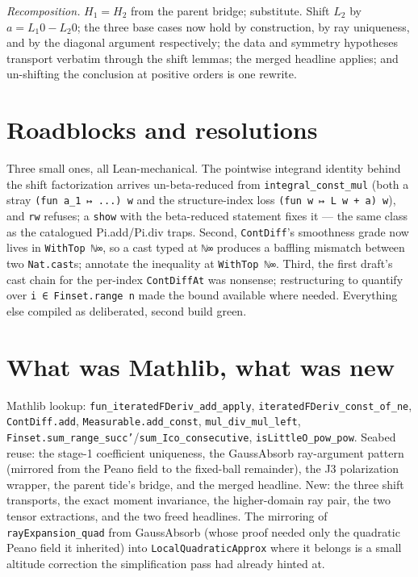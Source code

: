 \documentclass[11pt]{article}
\begin{document}
\emph{Recomposition.} $H_1 = H_2$ from the parent bridge; substitute.
Shift $L_2$ by $a = L_1 0 - L_2 0$; the three base cases now hold by
construction, by ray uniqueness, and by the diagonal argument
respectively; the data and symmetry hypotheses transport verbatim through
the shift lemmas; the merged headline applies; and un-shifting the
conclusion at positive orders is one rewrite.

\section{Roadblocks and resolutions}

Three small ones, all Lean-mechanical. The pointwise integrand identity
behind the shift factorization arrives un-beta-reduced from
\texttt{integral\_const\_mul} (both a stray \texttt{(fun a\_1 ↦ ...) w}
and the structure-index loss \texttt{(fun w ↦ L w + a) w}), and
\texttt{rw} refuses; a \texttt{show} with the beta-reduced statement
fixes it --- the same class as the catalogued Pi.add/Pi.div traps.
Second, \texttt{ContDiff}'s smoothness grade now lives in
\texttt{WithTop ℕ∞}, so a cast typed at \texttt{ℕ∞} produces a baffling
mismatch between two \texttt{Nat.cast}s; annotate the inequality at
\texttt{WithTop ℕ∞}. Third, the first draft's cast chain for the
per-index \texttt{ContDiffAt} was nonsense; restructuring to quantify
over \texttt{i ∈ Finset.range n} made the bound available where needed.
Everything else compiled as deliberated, second build green.

\section{What was Mathlib, what was new}

Mathlib lookup: \texttt{fun\_iteratedFDeriv\_add\_apply},
\texttt{iteratedFDeriv\_const\_of\_ne}, \texttt{ContDiff.add},
\texttt{Measurable.add\_const}, \texttt{mul\_div\_mul\_left},
\texttt{Finset.sum\_range\_succ'}/\texttt{sum\_Ico\_consecutive},
\texttt{isLittleO\_pow\_pow}. Seabed reuse: the stage-1 coefficient
uniqueness, the GaussAbsorb ray-argument pattern (mirrored from the
Peano field to the fixed-ball remainder), the J3 polarization wrapper,
the parent tide's bridge, and the merged headline. New: the three shift
transports, the exact moment invariance, the higher-domain ray pair, the
two tensor extractions, and the two freed headlines. The mirroring of
\texttt{rayExpansion\_quad} from GaussAbsorb (whose proof needed only the
quadratic Peano field it inherited) into \texttt{LocalQuadraticApprox}
where it belongs is a small altitude correction the simplification pass
had already hinted at.
\end{document}

